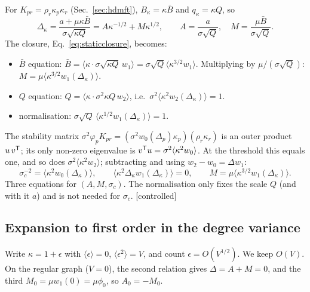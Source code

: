 \documentclass[11pt]{article}
\newcommand{\controlled}{\textsf{\small[controlled]}}
\begin{document}
For $K_{pr}=\rho_r\kappa_p\kappa_r$ (Sec.~\ref{sec:hdmft}), $B_\kappa=\kappa\bar B$ and $q_\kappa=\kappa Q$, so
\begin{equation}
\Delta_\kappa=\frac{a+\mu\kappa\bar B}{\sigma\sqrt{\kappa Q}}=A\kappa^{-1/2}+M\kappa^{1/2},\qquad A=\frac{a}{\sigma\sqrt Q},\quad M=\frac{\mu\bar B}{\sigma\sqrt Q}.
\end{equation}
The closure, Eq.~\eqref{eq:staticclosure}, becomes:
\begin{itemize}
\item $\bar B$ equation: $\bar B=\langle\kappa\cdot\sigma\sqrt{\kappa Q}\,w_1\rangle=\sigma\sqrt Q\langle\kappa^{3/2}w_1\rangle$.
  Multiplying by
  $\mu/(\sigma\sqrt Q)$: $M=\mu\langle\kappa^{3/2}w_1(\Delta_\kappa)\rangle$.
\item $Q$ equation: $Q=\langle\kappa\cdot\sigma^2\kappa Q\,w_2\rangle$, i.e.\ $\sigma^2\langle\kappa^2w_2(\Delta_\kappa)\rangle=1$.
\item normalisation: $\sigma\sqrt Q\,\langle\kappa^{1/2}w_1(\Delta_\kappa)\rangle=1$.
\end{itemize}
The stability matrix $\sigma^2\varphi_pK_{pr}=(\sigma^2w_0(\Delta_p)\kappa_p)(\rho_r\kappa_r)$ is an outer product $u\,v^{\sf T}$; its only
non-zero eigenvalue is $v^{\sf T}u=\sigma^2\langle\kappa^2w_0\rangle$.  At the threshold this equals one, and so does
$\sigma^2\langle\kappa^2w_2\rangle$; subtracting and using $w_2-w_0=\Delta w_1$:
\begin{equation}
\boxed{\sigma_c^{-2}=\langle\kappa^2w_0(\Delta_\kappa)\rangle,\qquad\langle\kappa^2\Delta_\kappa w_1(\Delta_\kappa)\rangle=0,\qquad M=\mu\langle\kappa^{3/2}w_1(\Delta_\kappa)\rangle.}
\label{eq:rankone}
\end{equation}
Three equations for $(A,M,\sigma_c)$.  The normalisation only fixes the scale $Q$ (and with it $a$) and is not
needed for $\sigma_c$.  \controlled

\subsection{Expansion to first order in the degree variance}

Write $\kappa=1+\epsilon$ with $\langle\epsilon\rangle=0$, $\langle\epsilon^2\rangle=V$, and count $\epsilon=O(V^{1/2})$.  We keep
$O(V)$.  On the regular graph ($V=0$), the second relation gives $\Delta=A+M=0$, and the third
$M_0=\mu w_1(0)=\mu\phi_0$, so $A_0=-M_0$.
\end{document}
